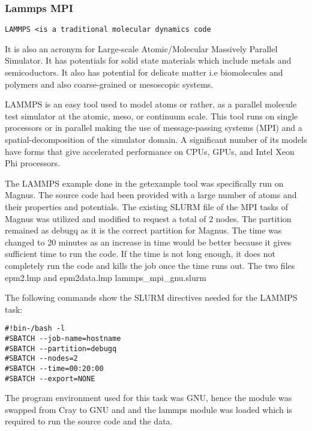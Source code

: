 \subsubsection{Lammps MPI}

\begin{tcolorbox}
\begin{Verbatim}[fontsize=\scriptsize]
LAMMPS <is a traditional molecular dynamics code
\end{Verbatim} 
\end{tcolorbox}

It is also an acronym for Large-scale Atomic/Molecular Massively Parallel Simulator. It has potentials
for solid state materials which include metals and semicoductors. It also has potential for delicate matter i.e biomolecules and polymers and also
coarse-grained or mesoscopic systems.

LAMMPS is an easy tool used to model atoms or rather, as a parallel molecule test simulator at the atomic, meso, or continuum scale. This tool runs on
single processors or in parallel making the use of message-passing systems (MPI) and a spatial-decomposition of the simulator domain. A significant
number of its models have forms that give accelerated performance on CPUs, GPUs, and Intel Xeon Phi processors.

The LAMMPS example done in the getexample tool was specifically run on Magnus. The source code had been provided with a large number of atoms and their
properties and potentials. The existing SLURM file of the MPI tasks of Magnus was utilized and modified to request a total of 2 nodes. The partition
remained as debugq as it is the correct partition for Magnus. The time was changed to 20 minutes as an increase in time would be better because it gives
sufficient time to run the code. If the time is not long enough, it does not completely run the code and kills the job once the time runs out.
The two files epm2.lmp and epm2data.lmp  lammps\_mpi\_gnu.slurm

The following commands show the SLURM directives needed for the LAMMPS task:

\begin{tcolorbox}
\begin{Verbatim}[fontsize=\scriptsize]
#!bin-/bash -l
#SBATCH --job-name=hostname
#SBATCH --partition=debugq
#SBATCH --nodes=2
#SBATCH --time=00:20:00
#SBATCH --export=NONE
\end{Verbatim}
\end{tcolorbox}

The program environment used for this task was GNU, hence the module was swapped from Cray to GNU and and the lammps module was loaded which is required
to run the source code and the data.

